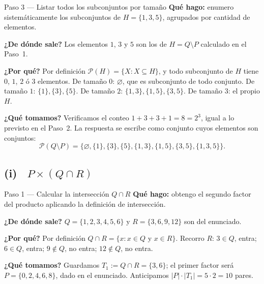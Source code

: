 \documentclass[11pt]{article}
\begin{document}
\begin{paso}{Paso 3 --- Listar todos los subconjuntos por tamaño}
\textbf{Qué hago:} enumero sistemáticamente los subconjuntos de $H=\{1,3,5\}$, agrupados por
cantidad de elementos.

\textbf{¿De dónde sale?} Los elementos $1$, $3$ y $5$ son los de $H=Q\setminus P$ calculado en
el Paso~1.

\textbf{¿Por qué?} Por definición $\mathcal{P}(H)=\{X: X\subseteq H\}$, y todo subconjunto de
$H$ tiene $0$, $1$, $2$ ó $3$ elementos. De tamaño $0$: $\varnothing$, que es subconjunto de
todo conjunto. De tamaño $1$: $\{1\},\{3\},\{5\}$. De tamaño $2$: $\{1,3\},\{1,5\},\{3,5\}$.
De tamaño $3$: el propio $H$.

\textbf{¿Qué tomamos?} Verificamos el conteo $1+3+3+1=8=2^{3}$, igual a lo previsto en el
Paso~2. La respuesta se escribe como conjunto cuyos elementos son conjuntos:
\[
\mathcal{P}(Q\setminus P)=\bigl\{\varnothing,\{1\},\{3\},\{5\},\{1,3\},\{1,5\},\{3,5\},\{1,3,5\}\bigr\}.
\]
\end{paso}

\subsection*{(i) \ $P\times(Q\cap R)$}

\begin{paso}{Paso 1 --- Calcular la intersección $Q\cap R$}
\textbf{Qué hago:} obtengo el segundo factor del producto aplicando la definición de
intersección.

\textbf{¿De dónde sale?} $Q=\{1,2,3,4,5,6\}$ y $R=\{3,6,9,12\}$ son del enunciado.

\textbf{¿Por qué?} Por definición $Q\cap R=\{x: x\in Q \text{ y } x\in R\}$. Recorro $R$:
$3\in Q$, entra; $6\in Q$, entra; $9\notin Q$, no entra; $12\notin Q$, no entra.

\textbf{¿Qué tomamos?} Guardamos $T_1:=Q\cap R=\{3,6\}$; el primer factor será
$P=\{0,2,4,6,8\}$, dado en el enunciado. Anticipamos
$|P|\cdot|T_1|=5\cdot 2=10$ pares.
\end{paso}
\end{document}
